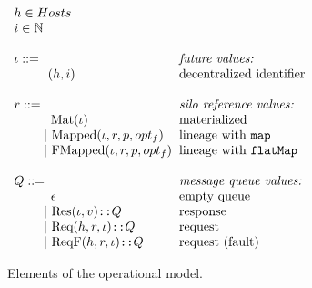 \documentclass{article}
\theoremstyle{definition}
\newcommand{\gap}{\quad\quad}
\newcommand{\ba}{\begin{array}}
\newcommand{\ea}{\end{array}}
\begin{document}
\begin{figure}[ht!]
\centering

$\ba[t]{l@{\hspace{2mm}}l}
h \in Hosts                                         & \\   
i \in \mathbb{N}                                    & \\   
                                                    & \\   
\iota  ::=                                          & \mbox{{\it{future values:}}} \\
\gap \:\:\: (h, i)                                  & \mbox{decentralized identifier} \\   
                                                    & \\   
r ::=                                               & \mbox{{\it{silo reference values:}}} \\
\gap \:\:\:\: \text{Mat}(\iota)                     & \mbox{materialized} \\    
\gap ~|~  \text{Mapped}(\iota, r, p, opt_f)         & \mbox{lineage with \texttt{map}} \\    
\gap ~|~  \text{FMapped}(\iota, r, p, opt_f)        & \mbox{lineage with \texttt{flatMap}} \\   
                                                    & \\   
Q      ::=                                          & \mbox{{\it{message queue values:}}} \\
\gap \:\:\:\: \epsilon                              & \mbox{empty queue} \\
\gap ~|~    \text{Res}(\iota, v) \texttt{::} Q      & \mbox{response} \\
\gap ~|~    \text{Req}(h, r, \iota) \texttt{::} Q   & \mbox{request}  \\
\gap ~|~    \text{ReqF}(h, r, \iota) \texttt{::} Q  & \mbox{request (fault)} \\
\ea$

\caption{Elements of the operational model.}
\label{fig:elems-opsem}

\end{figure}
\end{document}
